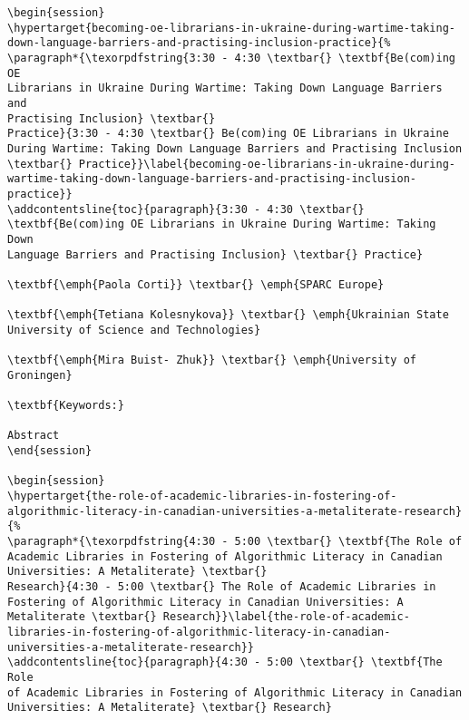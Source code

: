 \documentclass[
]{book}
\begin{document}
\begin{verbatim}
\begin{session}
\hypertarget{becoming-oe-librarians-in-ukraine-during-wartime-taking-down-language-barriers-and-practising-inclusion-practice}{%
\paragraph*{\texorpdfstring{3:30 - 4:30 \textbar{} \textbf{Be(com)ing OE
Librarians in Ukraine During Wartime: Taking Down Language Barriers and
Practising Inclusion} \textbar{}
Practice}{3:30 - 4:30 \textbar{} Be(com)ing OE Librarians in Ukraine During Wartime: Taking Down Language Barriers and Practising Inclusion \textbar{} Practice}}\label{becoming-oe-librarians-in-ukraine-during-wartime-taking-down-language-barriers-and-practising-inclusion-practice}}
\addcontentsline{toc}{paragraph}{3:30 - 4:30 \textbar{}
\textbf{Be(com)ing OE Librarians in Ukraine During Wartime: Taking Down
Language Barriers and Practising Inclusion} \textbar{} Practice}

\textbf{\emph{Paola Corti}} \textbar{} \emph{SPARC Europe}

\textbf{\emph{Tetiana Kolesnykova}} \textbar{} \emph{Ukrainian State
University of Science and Technologies}

\textbf{\emph{Mira Buist- Zhuk}} \textbar{} \emph{University of
Groningen}

\textbf{Keywords:}

Abstract
\end{session}

\begin{session}
\hypertarget{the-role-of-academic-libraries-in-fostering-of-algorithmic-literacy-in-canadian-universities-a-metaliterate-research}{%
\paragraph*{\texorpdfstring{4:30 - 5:00 \textbar{} \textbf{The Role of
Academic Libraries in Fostering of Algorithmic Literacy in Canadian
Universities: A Metaliterate} \textbar{}
Research}{4:30 - 5:00 \textbar{} The Role of Academic Libraries in Fostering of Algorithmic Literacy in Canadian Universities: A Metaliterate \textbar{} Research}}\label{the-role-of-academic-libraries-in-fostering-of-algorithmic-literacy-in-canadian-universities-a-metaliterate-research}}
\addcontentsline{toc}{paragraph}{4:30 - 5:00 \textbar{} \textbf{The Role
of Academic Libraries in Fostering of Algorithmic Literacy in Canadian
Universities: A Metaliterate} \textbar{} Research}


\end{verbatim}
\end{document}
